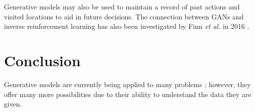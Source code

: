 \documentclass[11pt]{article}
\begin{document}
Generative models may also be used to maintain a record of past actions and visited locations to aid in future decisions. The connection between GANs and inverse reinforcement learning has also been investigated by Finn \textit{et al.} in 2016 \citep{2016arXiv161103852F}.

\section{Conclusion}
Generative models are currently being applied to many problems \citep{genmodelingopenai}; however, they offer many more possibilities due to their ability to understand the data they are given.



\end{document}
